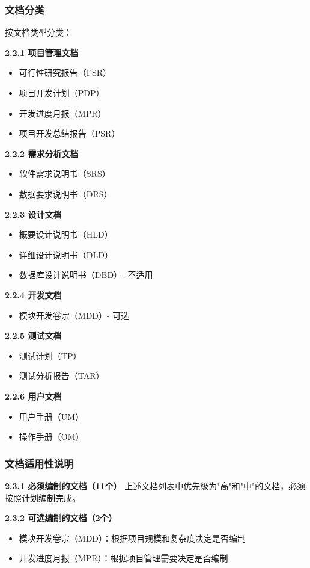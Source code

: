 \documentclass[12pt,a4paper]{article}
\numberwithin{equation}{section}  %
\begin{document}
\subsubsection{文档分类}
按文档类型分类：

\textbf{2.2.1 项目管理文档}
\begin{itemize}
\item 可行性研究报告（FSR）
\item 项目开发计划（PDP）
\item 开发进度月报（MPR）
\item 项目开发总结报告（PSR）
\end{itemize}

\textbf{2.2.2 需求分析文档}
\begin{itemize}
\item 软件需求说明书（SRS）
\item 数据要求说明书（DRS）
\end{itemize}

\textbf{2.2.3 设计文档}
\begin{itemize}
\item 概要设计说明书（HLD）
\item 详细设计说明书（DLD）
\item 数据库设计说明书（DBD）- 不适用
\end{itemize}

\textbf{2.2.4 开发文档}
\begin{itemize}
\item 模块开发卷宗（MDD）- 可选
\end{itemize}

\textbf{2.2.5 测试文档}
\begin{itemize}
\item 测试计划（TP）
\item 测试分析报告（TAR）
\end{itemize}

\textbf{2.2.6 用户文档}
\begin{itemize}
\item 用户手册（UM）
\item 操作手册（OM）
\end{itemize}

\subsubsection{文档适用性说明}
\textbf{2.3.1 必须编制的文档（11个）}
上述文档列表中优先级为"高"和"中"的文档，必须按照计划编制完成。

\textbf{2.3.2 可选编制的文档（2个）}
\begin{itemize}
\item 模块开发卷宗（MDD）：根据项目规模和复杂度决定是否编制
\item 开发进度月报（MPR）：根据项目管理需要决定是否编制
\end{itemize}
\end{document}

